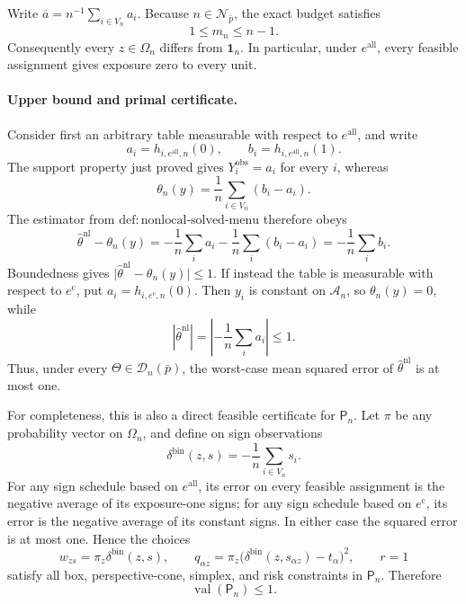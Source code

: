 Write \(\overline a=n^{-1}\sum_{i\in V_n}a_i\).  Because \(n\in\mathcal N_{\bar p}\), the exact budget satisfies
\[
1\le m_n\le n-1.
\]
Consequently every \(z\in\Omega_n\) differs from \(\mathbf 1_n\).  In particular, under \(e^{\mathrm{all}}\), every feasible assignment gives exposure zero to every unit.

\paragraph{Upper bound and primal certificate.}
Consider first an arbitrary table measurable with respect to \(e^{\mathrm{all}}\), and write
\[
a_i=h_{i,e^{\mathrm{all}},n}(0),
\qquad
b_i=h_{i,e^{\mathrm{all}},n}(1).
\]
The support property just proved gives \(Y_i^{\mathrm{obs}}=a_i\) for every \(i\), whereas
\[
\theta_n(y)=\frac1n\sum_{i\in V_n}(b_i-a_i).
\]
The estimator from \(\mathrm{def{:}nonlocal\text{-}solved\text{-}menu}\) therefore obeys
\[
\widehat\theta^{\mathrm{nl}}-\theta_n(y)
=-\frac1n\sum_i a_i-\frac1n\sum_i(b_i-a_i)
=-\frac1n\sum_i b_i.
\]
Boundedness gives \(\lvert \widehat\theta^{\mathrm{nl}}-\theta_n(y)\rvert\le1\).  If instead the table is measurable with respect to \(e^{\mathrm c}\), put \(a_i=h_{i,e^{\mathrm c},n}(0)\).  Then \(y_i\) is constant on \(\mathcal A_n\), so \(\theta_n(y)=0\), while
\[
\left\lvert\widehat\theta^{\mathrm{nl}}\right\rvert
=\left\lvert-\frac1n\sum_i a_i\right\rvert\le1.
\]
Thus, under every \(\Theta\in\mathcal D_n(\bar p)\), the worst-case mean squared error of \(\widehat\theta^{\mathrm{nl}}\) is at most one.

For completeness, this is also a direct feasible certificate for \(\mathsf P_n\).  Let \(\pi\) be any probability vector on \(\Omega_n\), and define on sign observations
\[
\delta^{\mathrm{bin}}(z,s)=-\frac1n\sum_{i\in V_n}s_i.
\]
For any sign schedule based on \(e^{\mathrm{all}}\), its error on every feasible assignment is the negative average of its exposure-one signs; for any sign schedule based on \(e^{\mathrm c}\), its error is the negative average of its constant signs.  In either case the squared error is at most one.  Hence the choices
\[
w_{zs}=\pi_z\delta^{\mathrm{bin}}(z,s),
\qquad
q_{\alpha z}=\pi_z
 \bigl(\delta^{\mathrm{bin}}(z,s_{\alpha z})-t_\alpha\bigr)^2,
\qquad r=1
\]
satisfy all box, perspective-cone, simplex, and risk constraints in \(\mathsf P_n\).  Therefore
\[
\operatorname{val}(\mathsf P_n)\le1.
\]

